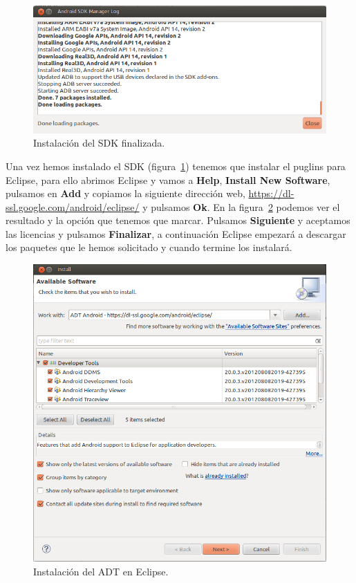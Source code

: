 \begin{figure}
  \centering
    \includegraphics[scale=0.6]{./AnexoConfiguracionEclipse/imagenes/SDKfinalizado.png}
  \caption{Instalación del SDK finalizada.}
  \label{fig:SDKfinalizado}
\end{figure}

Una vez hemos instalado el SDK (figura~\ref{fig:SDKfinalizado}) tenemos que instalar el puglins para Eclipse, para ello abrimos Eclipse y vamos a \textbf{Help}, \textbf{Install New Software}, pulsamos en \textbf{Add} y copiamos la siguiente dirección web, \url{https://dl-ssl.google.com/android/eclipse/} y pulsamos \textbf{Ok}. En la figura~\ref{fig:instalacionADT} podemos ver el resultado y la opción que tenemos que marcar. Pulsamos \textbf{Siguiente} y aceptamos las licencias y pulsamos \textbf{Finalizar}, a continuación Eclipse empezará a descargar los paquetes que le hemos solicitado y cuando termine los instalará.

\begin{figure}
  \centering
    \includegraphics[scale=0.6]{./AnexoConfiguracionEclipse/imagenes/instalacionADT.png}
  \caption{Instalación del ADT en Eclipse.}
  \label{fig:instalacionADT}
\end{figure}

